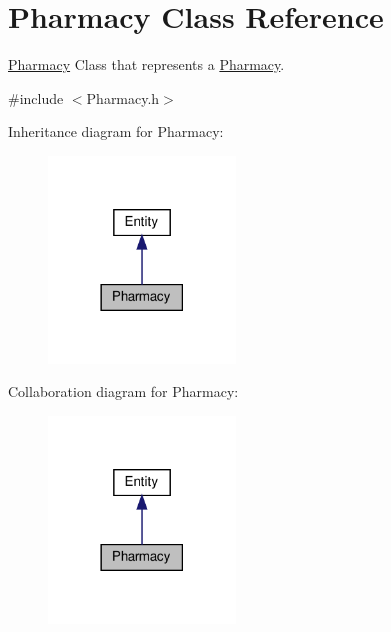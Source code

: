 \hypertarget{classPharmacy}{}\section{Pharmacy Class Reference}
\label{classPharmacy}


\hyperlink{classPharmacy}{Pharmacy} Class that represents a \hyperlink{classPharmacy}{Pharmacy}.  




{\ttfamily \#include $<$Pharmacy.\+h$>$}



Inheritance diagram for Pharmacy\+:\nopagebreak
\begin{figure}[H]
\begin{center}
\leavevmode
\includegraphics[width=141pt]{classPharmacy__inherit__graph}
\end{center}
\end{figure}


Collaboration diagram for Pharmacy\+:\nopagebreak
\begin{figure}[H]
\begin{center}
\leavevmode
\includegraphics[width=141pt]{classPharmacy__coll__graph}
\end{center}
\end{figure}
